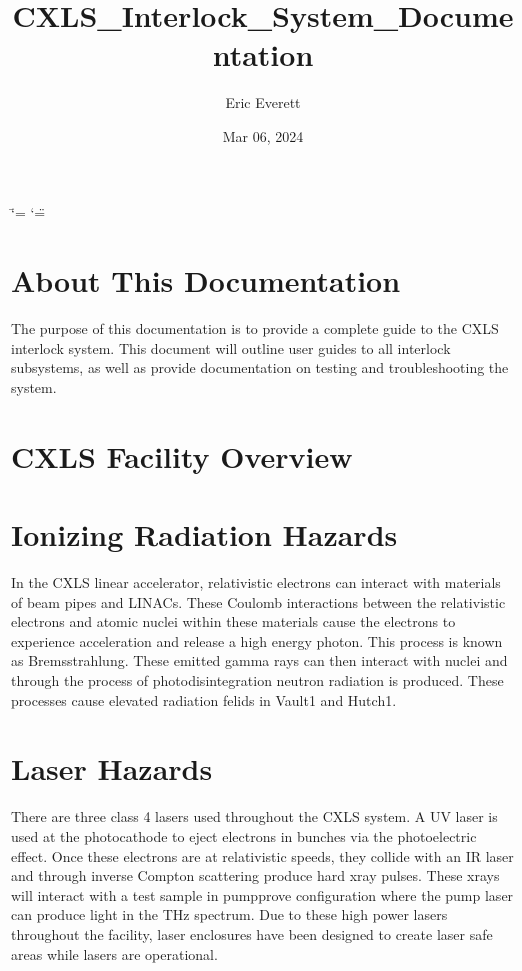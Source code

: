 \documentclass[letterpaper,10pt,english]{sphinxmanual}
\title{CXLS_Interlock_System_Documentation}
\date{Mar 06, 2024}
\author{Eric Everett}
\begin{document}
\ifdefined\shorthandoff
  \ifnum\catcode`\=\string=\active\shorthandoff{=}\fi
  \ifnum\catcode`\"=\active{}\fi
\fi

\pagestyle{empty}
\sphinxmaketitle
\pagestyle{plain}
\sphinxtableofcontents
\pagestyle{normal}
\label{\detokenize{index::doc}}



\chapter{About This Documentation}
\label{\detokenize{index:about-this-documentation}}
\sphinxAtStartPar
The purpose of this documentation is to provide a complete guide to the CXLS interlock system.
This document will outline user guides to all interlock subsystems, as well as provide documentation on testing and troubleshooting the system.


\chapter{CXLS Facility Overview}
\label{\detokenize{index:cxls-facility-overview}}

\sphinxAtStartPar



\chapter{Ionizing Radiation Hazards}
\label{\detokenize{index:ionizing-radiation-hazards}}
\sphinxAtStartPar
In the CXLS linear accelerator, relativistic electrons can interact with materials of beam pipes and LINACs.
These Coulomb interactions between the relativistic electrons and atomic nuclei within these materials cause the electrons to experience acceleration and release a high energy photon.
This process is known as Bremsstrahlung. These emitted gamma rays can then interact with nuclei and through the process of photodisintegration neutron radiation is produced.
These processes cause elevated radiation felids in Vault\sphinxhyphen{}1 and Hutch\sphinxhyphen{}1.


\chapter{Laser Hazards}
\label{\detokenize{index:laser-hazards}}
\sphinxAtStartPar
There are three class 4 lasers used throughout the CXLS system.
A UV laser is used at the photocathode to eject electrons in bunches via the photoelectric effect.
Once these electrons are at relativistic speeds, they collide with an IR laser and through inverse Compton scattering produce hard x\sphinxhyphen{}ray pulses.
These x\sphinxhyphen{}rays will interact with a test sample in pump\sphinxhyphen{}prove configuration where the pump laser can produce light in the THz spectrum.
Due to these high power lasers throughout the facility, laser enclosures have been designed to create laser safe areas while lasers are operational.
\end{document}

